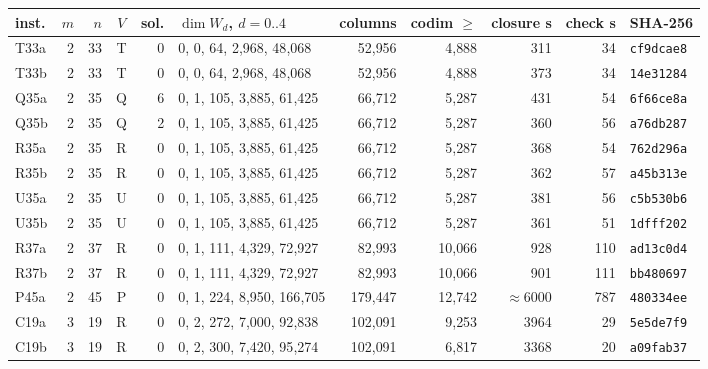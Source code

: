 \begin{tabular}{@{}lrrcrlrrrrl@{}}
\toprule
inst. & $m$ & $n$ & $V$ & sol. & $\dim W_d$, $d=0..4$ & columns & codim $\ge$ & closure s & check s & SHA-256 \\
\midrule
T33a & 2 & 33 & T & 0 & 0, 0, 64, 2{,}968, 48{,}068 & 52{,}956 & 4{,}888 & 311 & 34 & \texttt{cf9dcae8} \\
T33b & 2 & 33 & T & 0 & 0, 0, 64, 2{,}968, 48{,}068 & 52{,}956 & 4{,}888 & 373 & 34 & \texttt{14e31284} \\
Q35a & 2 & 35 & Q & 6 & 0, 1, 105, 3{,}885, 61{,}425 & 66{,}712 & 5{,}287 & 431 & 54 & \texttt{6f66ce8a} \\
Q35b & 2 & 35 & Q & 2 & 0, 1, 105, 3{,}885, 61{,}425 & 66{,}712 & 5{,}287 & 360 & 56 & \texttt{a76db287} \\
R35a & 2 & 35 & R & 0 & 0, 1, 105, 3{,}885, 61{,}425 & 66{,}712 & 5{,}287 & 368 & 54 & \texttt{762d296a} \\
R35b & 2 & 35 & R & 0 & 0, 1, 105, 3{,}885, 61{,}425 & 66{,}712 & 5{,}287 & 362 & 57 & \texttt{a45b313e} \\
U35a & 2 & 35 & U & 0 & 0, 1, 105, 3{,}885, 61{,}425 & 66{,}712 & 5{,}287 & 381 & 56 & \texttt{c5b530b6} \\
U35b & 2 & 35 & U & 0 & 0, 1, 105, 3{,}885, 61{,}425 & 66{,}712 & 5{,}287 & 361 & 51 & \texttt{1dfff202} \\
R37a & 2 & 37 & R & 0 & 0, 1, 111, 4{,}329, 72{,}927 & 82{,}993 & 10{,}066 & 928 & 110 & \texttt{ad13c0d4} \\
R37b & 2 & 37 & R & 0 & 0, 1, 111, 4{,}329, 72{,}927 & 82{,}993 & 10{,}066 & 901 & 111 & \texttt{bb480697} \\
P45a & 2 & 45 & P & 0 & 0, 1, 224, 8{,}950, 166{,}705 & 179{,}447 & 12{,}742 & $\approx$6000 & 787 & \texttt{480334ee} \\
C19a & 3 & 19 & R & 0 & 0, 2, 272, 7{,}000, 92{,}838 & 102{,}091 & 9{,}253 & 3964 & 29 & \texttt{5e5de7f9} \\
C19b & 3 & 19 & R & 0 & 0, 2, 300, 7{,}420, 95{,}274 & 102{,}091 & 6{,}817 & 3368 & 20 & \texttt{a09fab37} \\
\bottomrule
\end{tabular}
